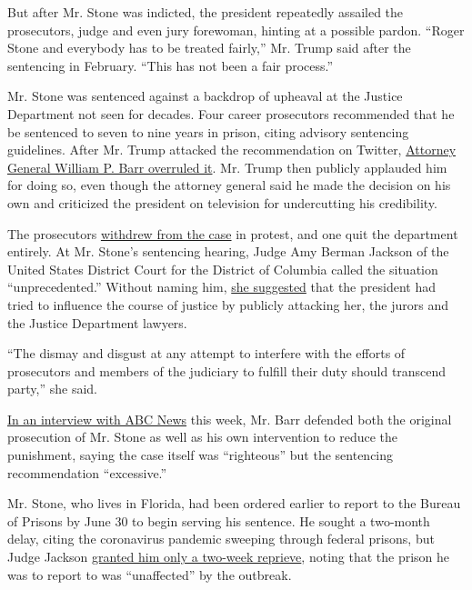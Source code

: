 But after Mr. Stone was indicted, the president repeatedly assailed the
prosecutors, judge and even jury forewoman, hinting at a possible
pardon. ``Roger Stone and everybody has to be treated fairly,'' Mr.
Trump said after the sentencing in February. ``This has not been a fair
process.''

Mr. Stone was sentenced against a backdrop of upheaval at the Justice
Department not seen for decades. Four career prosecutors recommended
that he be sentenced to seven to nine years in prison, citing advisory
sentencing guidelines. After Mr. Trump attacked the recommendation on
Twitter,
\href{https://www.nytimes.com/2020/02/11/us/politics/roger-stone-sentencing.html}{Attorney
General William P. Barr overruled it}. Mr. Trump then publicly applauded
him for doing so, even though the attorney general said he made the
decision on his own and criticized the president on television for
undercutting his credibility.

The prosecutors
\href{https://www.nytimes.com/2020/02/11/us/politics/roger-stone-sentencing.html}{withdrew
from the case} in protest, and one quit the department entirely. At Mr.
Stone's sentencing hearing, Judge Amy Berman Jackson of the United
States District Court for the District of Columbia called the situation
``unprecedented.'' Without naming him,
\href{https://www.nytimes.com/2020/02/20/us/roger-stone-40-months-sentencing-verdict.html}{she
suggested} that the president had tried to influence the course of
justice by publicly attacking her, the jurors and the Justice Department
lawyers.

``The dismay and disgust at any attempt to interfere with the efforts of
prosecutors and members of the judiciary to fulfill their duty should
transcend party,'' she said.

\href{https://www.google.com/amp/s/abcnews.go.com/amp/Politics/attorney-general-william-barr-defends-justice-department-claims/story\%3fid=71680447}{In
an interview with ABC News} this week, Mr. Barr defended both the
original prosecution of Mr. Stone as well as his own intervention to
reduce the punishment, saying the case itself was ``righteous'' but the
sentencing recommendation ``excessive.''

Mr. Stone, who lives in Florida, had been ordered earlier to report to
the Bureau of Prisons by June 30 to begin serving his sentence. He
sought a two-month delay, citing the coronavirus pandemic sweeping
through federal prisons, but Judge Jackson
\href{https://www.nytimes.com/2020/06/26/us/politics/roger-stone-prison.html}{granted
him only a two-week reprieve}, noting that the prison he was to report
to was ``unaffected'' by the outbreak.

